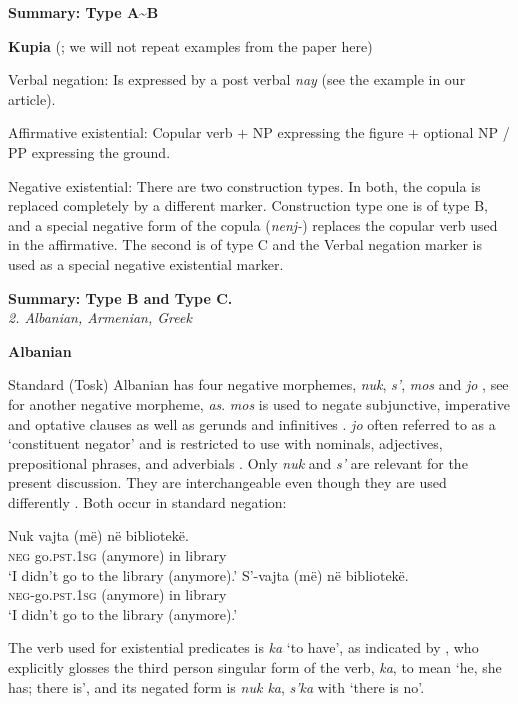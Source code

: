 \documentclass[output=paper]{langsci/langscibook}
\begin{document}
\begin{unindented}
\textbf{Summary: Type A{\textasciitilde}B}

\textbf{Kupia} (\cites{Christmas1973a}{Christmas1973b}; we will not repeat examples from the paper here)

Verbal negation: Is expressed by a post verbal \textit{nay} (see the example in our article). 

Affirmative existential: Copular verb + NP expressing the figure + optional NP / PP expressing the ground.

Negative existential: There are two construction types. In both, the copula is replaced completely by a different marker. Construction type one is of type B, and a special negative form of the copula (\textit{nenj-}) replaces the copular verb used in the affirmative. The second is of type C and the Verbal negation marker is used as a special negative existential marker.

\textbf{Summary: Type B and Type C.}\\

\textit{2. Albanian, Armenian, Greek}

\textbf{Albanian}

Standard (Tosk) Albanian has four negative morphemes, \textit{nuk},
\textit{s’}, \textit{mos} and \textit{jo} \citep[82]{Turano2000}, see
\citet[172]{BuchholzFiedler1987} for another negative morpheme,
\textit{as}. \textit{mos} is used to negate subjunctive, imperative and
optative clauses as well as gerunds and infinitives \citep[85]{Turano2000}.
\textit{jo} often referred to as a `constituent negator' and is restricted
to use with nominals, adjectives, prepositional phrases, and adverbials
\citep[86]{Turano2000}. Only \textit{nuk} and \textit{s’} are relevant for
the present discussion. They are interchangeable even though they are used
differently \parencite[172]{BuchholzFiedler1987}. Both occur in standard negation:
%
\begin{exe}\ex \gll Nuk vajta (më) në bibliotekë.  \\
\textsc{neg} go.\textsc{pst.1sg} (anymore) in library \\
    \glt `I didn't go to the library (anymore).' \citep[82]{Turano2000}
\ex \gll S’-vajta (më) në bibliotekë.  \\
\textsc{neg}-go.\textsc{pst}.\textsc{1sg} (anymore) in library \\
    \glt `I didn't go to the library (anymore).' \citep[82]{Turano2000}
    \end{exe}

The verb used for existential predicates is \textit{ka} `to have', as
indicated by \citet[12]{Camaj1984}, who explicitly glosses the third person
singular form of the verb, \textit{ka}, to mean `he, she has; there is',
and its negated form is \textit{nuk ka}, \textit{s’ka} with `there is no'. 


\end{unindented}
\end{document}
